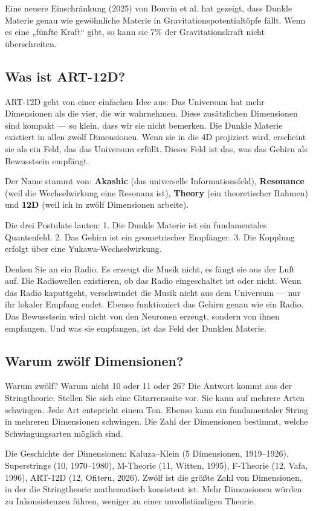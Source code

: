 \documentclass[11pt,a4paper]{article}
\begin{document}
Eine neuere Einschränkung (2025) von Bonvin et al. hat gezeigt, dass Dunkle Materie genau wie gewöhnliche Materie in Gravitationspotentialtöpfe fällt. Wenn es eine „fünfte Kraft`` gibt, so kann sie 7\% der Gravitationskraft nicht überschreiten.

\subsection{Was ist ART-12D?}
ART-12D geht von einer einfachen Idee aus: Das Universum hat mehr Dimensionen als die vier, die wir wahrnehmen. Diese zusätzlichen Dimensionen sind kompakt --- so klein, dass wir sie nicht bemerken. Die Dunkle Materie existiert in allen zwölf Dimensionen. Wenn sie in die 4D projiziert wird, erscheint sie als ein Feld, das das Universum erfüllt. Dieses Feld ist das, was das Gehirn als Bewusstsein empfängt.

Der Name stammt von: \textbf{Akashic} (das universelle Informationsfeld), \textbf{Resonance} (weil die Wechselwirkung eine Resonanz ist), \textbf{Theory} (ein theoretischer Rahmen) und \textbf{12D} (weil ich in zwölf Dimensionen arbeite).

Die drei Postulate lauten: 1. Die Dunkle Materie ist ein fundamentales Quantenfeld. 2. Das Gehirn ist ein geometrischer Empfänger. 3. Die Kopplung erfolgt über eine Yukawa-Wechselwirkung.

Denken Sie an ein Radio. Es erzeugt die Musik nicht, es fängt sie aus der Luft auf. Die Radiowellen existieren, ob das Radio eingeschaltet ist oder nicht. Wenn das Radio kaputtgeht, verschwindet die Musik nicht aus dem Universum --- nur ihr lokaler Empfang endet. Ebenso funktioniert das Gehirn genau wie ein Radio. Das Bewusstsein wird nicht von den Neuronen erzeugt, sondern von ihnen empfangen. Und was sie empfangen, ist das Feld der Dunklen Materie.

\subsection{Warum zwölf Dimensionen?}
Warum zwölf? Warum nicht 10 oder 11 oder 26? Die Antwort kommt aus der Stringtheorie. Stellen Sie sich eine Gitarrensaite vor. Sie kann auf mehrere Arten schwingen. Jede Art entspricht einem Ton. Ebenso kann ein fundamentaler String in mehreren Dimensionen schwingen. Die Zahl der Dimensionen bestimmt, welche Schwingungsarten möglich sind.

Die Geschichte der Dimensionen: Kaluza--Klein (5 Dimensionen, 1919--1926), Superstrings (10, 1970--1980), M-Theorie (11, Witten, 1995), F-Theorie (12, Vafa, 1996), ART-12D (12, Ofiteru, 2026). Zwölf ist die größte Zahl von Dimensionen, in der die Stringtheorie mathematisch konsistent ist. Mehr Dimensionen würden zu Inkonsistenzen führen, weniger zu einer unvollständigen Theorie.
\end{document}
